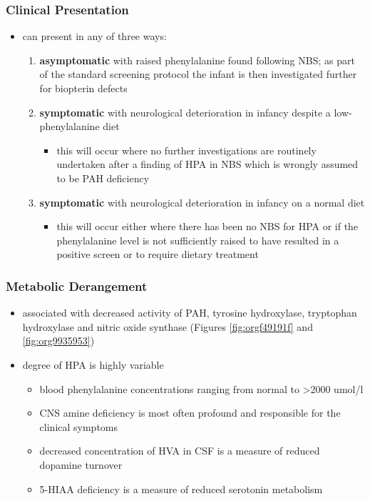 \documentclass{scrartcl}
\begin{document}
\subsubsection{Clinical Presentation}
\label{sec:orgb31dcad}
\begin{itemize}
\item can present in any of three ways:
\begin{enumerate}
\item \textbf{asymptomatic} with raised phenylalanine found following NBS; as part of
the standard screening protocol the infant is then investigated
further for biopterin defects
\item \textbf{symptomatic} with neurological deterioration in infancy despite a
low-phenylalanine diet
\begin{itemize}
\item this will occur where no further investigations are routinely
undertaken after a finding of HPA in NBS which is wrongly
assumed to be PAH deficiency
\end{itemize}
\item \textbf{symptomatic} with neurological deterioration in infancy on a
normal diet
\begin{itemize}
\item this will occur either where there has been no NBS for HPA or
if the phenylalanine level is not sufficiently raised to have
resulted in a positive screen or to require dietary treatment
\end{itemize}
\end{enumerate}
\end{itemize}
\subsubsection{Metabolic Derangement}
\label{sec:org2dff3c0}
\begin{itemize}
\item associated with decreased activity of PAH, tyrosine hydroxylase,
tryptophan hydroxylase and nitric oxide synthase (Figures \ref{fig:orgf49191f}
and \ref{fig:org9935953})
\item degree of HPA is highly variable
\begin{itemize}
\item blood phenylalanine concentrations ranging from normal to \textgreater{}2000
umol/l
\item CNS amine deficiency is most often profound and responsible for
the clinical symptoms
\item decreased concentration of HVA in CSF is a measure of reduced
dopamine turnover
\item 5-HIAA deficiency is a measure of reduced serotonin metabolism
\end{itemize}
\end{itemize}
\end{document}
